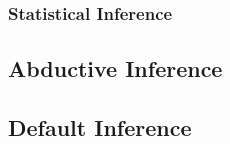 \subsubsection{Statistical Inference}\label{sec:statistical_inference}



\subsection{Abductive Inference}\label{sec:abductive_inference}



\subsection{Default Inference}\label{sec:default_inference}
